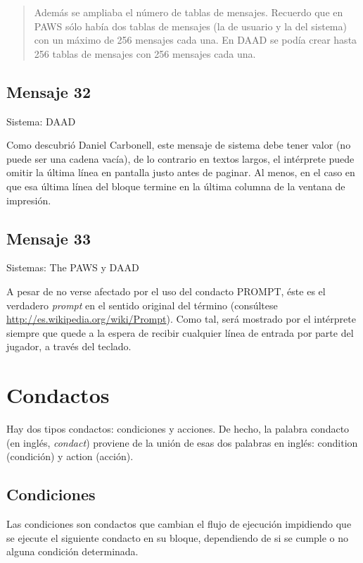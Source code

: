 \documentclass[11pt, a5paper]{article}
\newcommand{\paw}{\textsf{The PAWS}\xspace}
\newcommand{\daad}{\textsf{DAAD}\xspace}
\newcommand{\sistema}[1]{\noindent Sistema: #1 \nopagebreak}
\newcommand{\sistemas}[1]{\noindent Sistemas: #1 \nopagebreak}
\begin{document}
\begin{quote}
\guillemotleft Además se ampliaba el número de tablas de mensajes. Recuerdo que en PAWS sólo había dos tablas de mensajes (la de usuario y la del sistema) con un máximo de 256 mensajes cada una. En \daad se podía crear hasta 256 tablas de mensajes con 256 mensajes cada una.\guillemotright
\end{quote}

\subsection{Mensaje 32}

\sistema{\daad}

Como descubrió Daniel Carbonell, este mensaje de sistema debe tener valor (no puede ser una cadena vacía), de lo contrario en textos largos, el intérprete puede omitir la última línea en pantalla justo antes de paginar. Al menos, en el caso en que esa última línea del bloque termine en la última columna de la ventana de impresión.

\subsection{Mensaje 33}

\sistemas{\paw y \daad}

A pesar de no verse afectado por el uso del condacto PROMPT, éste es el verdadero \emph{prompt} en el sentido original del término (consúltese \url{http://es.wikipedia.org/wiki/Prompt}). Como tal, será mostrado por el intérprete siempre que quede a la espera de recibir cualquier línea de entrada por parte del jugador, a través del teclado.


\section{Condactos}

Hay dos tipos condactos: condiciones y acciones. De hecho, la palabra condacto (en inglés, \emph{condact}) proviene de la unión de esas dos palabras en inglés: condition (condición) y action (acción).

\subsection{Condiciones}

Las condiciones son condactos que cambian el flujo de ejecución impidiendo que se ejecute el siguiente condacto en su bloque, dependiendo de si se cumple o no alguna condición determinada.
\end{document}
